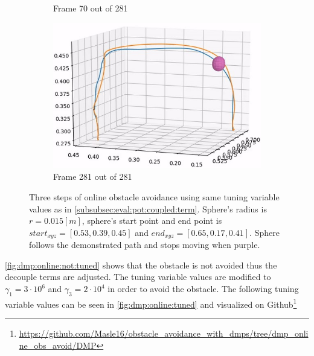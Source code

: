 \documentclass[../main.tex]{subfiles}
\begin{document}
\begin{figure}[H]
\begin{subfigure}[b]{0.32\textwidth}
        \caption{Frame 70 out of 281}
    \end{subfigure}
    \hfill
    \begin{subfigure}[b]{0.32\textwidth}
        \centering
        \includegraphics[width=\textwidth]{figures/online_obs/original_param/3D_ori_param-281.jpg}
        \caption{Frame 281 out of 281}
    \end{subfigure}
    \caption{Three steps of online obstacle avoidance using same tuning variable values as in \autoref{subsubsec:eval:pot:coupled:term}. Sphere's radius is $r=0.015[m]$, sphere's start point and end point is $start_{xyz}=[0.53, 0.39, 0.45]$ and $end_{xyz}=[0.65, 0.17, 0.41]$. Sphere follows the demonstrated path and stops moving when purple.}
    \label{fig:dmp:online:not:tuned}
\end{figure}

\autoref{fig:dmp:online:not:tuned} shows that the obstacle is not avoided thus the decouple terms are adjusted. The tuning variable values are modified to $\gamma_{1} = 3\cdot10^6$ and $\gamma_{3} = 2\cdot10^4$ in order to avoid the obstacle. The following tuning variable values can be seen in \autoref{fig:dmp:online:tuned} and visualized on Github\footnote{\url{https://github.com/Masle16/obstacle_avoidance_with_dmps/tree/dmp_online_obs_avoid/DMP}}

\end{document}
